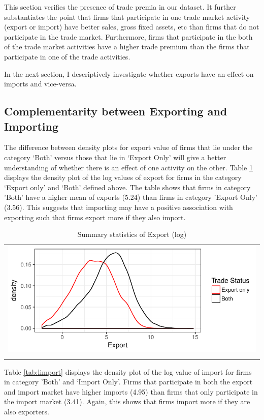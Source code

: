\documentclass[12pt]{article}
\begin{document}
This section verifies the presence of trade premia in our
dataset. It further substantiates the point that firms that
participate in one trade market activity (export or import) have
better sales, gross fixed assets, etc than firms that do not
participate in the trade market. Furthermore, firms that participate
in the both of the trade market activities have a higher trade premium
than the firms that participate in one of the trade activities. 

In the next section, I descriptively investigate whether exports have an effect
on imports and vice-versa.  

\subsection{Complementarity between Exporting and Importing}
The difference between density plots for export value of firms that
lie under the category `Both'  versus those that lie in `Export Only' will
give a better understanding of whether there is an effect of one activity on the other. 
Table \ref{tab:lexport} displays the density plot  of the log
values of export for firms in the category `Export only' and `Both'
defined above. The table shows that firms in category 'Both'
 have a higher mean of exports (5.24) than firms in category 'Export
 Only' (3.56). This suggests that importing may have a
positive association with exporting such that firms export more if
they also import.

\begin{center}
\begin{table}[H]
\caption{Summary statistics of Export (log)}
\label{tab:lexport}
\begin{tabular}{c}
 \includegraphics{./PICS/denslexport.pdf}   \\ 
   \\  
\end{tabular}
\end{table}
\end{center}
Table \ref{tab:limport} displays the density plot of the log value of
import  for firms in category 'Both' and `Import Only'.
Firms that participate in both the
export and import market have higher imports (4.95) than firms that only
participate in the import market (3.41). Again, this shows that firms
import more if they are also exporters. 
\end{document}
